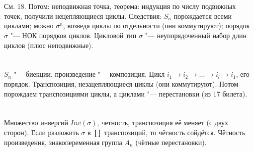 \section{} %
См. 18. Потом: неподвижная точка, теорема: индукция по числу подвижных точек, получили нецепляющиеся циклы. Следствия:
$S_n$ порождается всеми циклами; можно $\sigma^n$, возведя циклы по отдельности (они коммутируют); порядок $\sigma$ "--- НОК
порядков циклов. Цикловой тип $\sigma$ "--- неупорядоченный набор длин циклов (плюс неподвижные).

\section{} %
$S_n$ "--- биекции, произведение "--- композиция. Цикл $i_1 \to i_2 \to \dots \to i_l \to i_1$, его порядок. Транспозиция,
незацепляющиеся циклы (они коммутируют). Потом порождаем транспозициями циклы, а циклами "--- перестановки (из 17 билета).

\section{} %
Множество инверсий $Inv(\sigma)$, четность, транспозиция её меняет (с двух сторон). Если разложить $\sigma$ в $\prod$ транспозиций,
то чётность сойдётся. Чётность произведения, знакопеременная группа $A_n$ (чётные перестановки).
